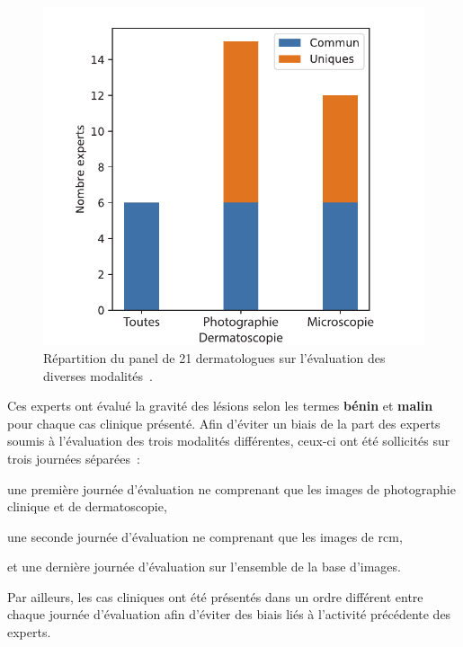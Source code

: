 \begin{figure}[H]
    \centering
    \includegraphics[width=0.6\linewidth]{contents/chapter_3_1/resources/experts_evaluation.pdf}
    \caption{Répartition du panel de 21 dermatologues sur l'évaluation des diverses modalités~\cite{Cinotti2018}.}
    \label{fig:experts_evaluation}
\end{figure}\par

Ces experts ont évalué la gravité des lésions selon les termes \textbf{bénin} et \textbf{malin} pour chaque cas clinique présenté. Afin d'éviter un biais de la part des experts soumis à l'évaluation des trois modalités différentes, ceux-ci ont été sollicités sur trois journées séparées~:
\begin{inlinerate}
    \item une première journée d'évaluation ne comprenant que les images de photographie clinique et de dermatoscopie,
    \item une seconde journée d'évaluation ne comprenant que les images de \gls{rcm},
    \item et une dernière journée d'évaluation sur l'ensemble de la base d'images.
\end{inlinerate}
Par ailleurs, les cas cliniques ont été présentés dans un ordre différent entre chaque journée d'évaluation afin d'éviter des biais liés à l'activité précédente des experts.\par

